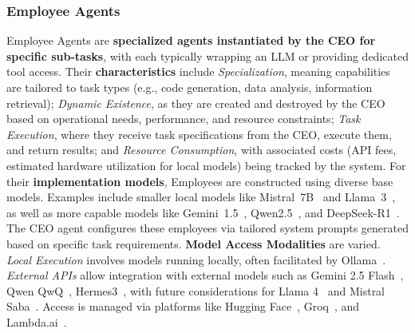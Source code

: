 \documentclass[twocolumn]{article}
\begin{document}
\subsubsection{Employee Agents}
Employee Agents are \textbf{specialized agents instantiated by the CEO for specific sub-tasks}, with each typically wrapping an LLM or providing dedicated tool access.
Their \textbf{characteristics} include \textit{Specialization}, meaning capabilities are tailored to task types (e.g., code generation, data analysis, information retrieval); \textit{Dynamic Existence}, as they are created and destroyed by the CEO based on operational needs, performance, and resource constraints; \textit{Task Execution}, where they receive task specifications from the CEO, execute them, and return results; and \textit{Resource Consumption}, with associated costs (API fees, estimated hardware utilization for local models) being tracked by the system.
For their \textbf{implementation models}, Employees are constructed using diverse base models. Examples include smaller local models like Mistral~7B~\cite{jiang2023mistral} and Llama~3~\cite{llama3herd}, as well as more capable models like Gemini~1.5~\cite{gemini1.5_report}, Qwen2.5~\cite{qwen2.5_report}, and DeepSeek-R1~\cite{deepseekr1_report}. The CEO agent configures these employees via tailored system prompts generated based on specific task requirements.
\textbf{Model Access Modalities} are varied. \textit{Local Execution} involves models running locally, often facilitated by Ollama~\cite{ollama}. \textit{External APIs} allow integration with external models such as Gemini 2.5 Flash~\cite{gemini25flash}, Qwen QwQ~\cite{QwenQwQ32B2025}, Hermes3~\cite{teknium2024hermes}, with future considerations for Llama 4~\cite{Llama4Herd2025} and Mistral Saba~\cite{MistralSaba2025}. Access is managed via platforms like Hugging Face~\cite{huggingface2025}, Groq~\cite{groq2025}, and Lambda.ai~\cite{lambda2025}.
\end{document}

